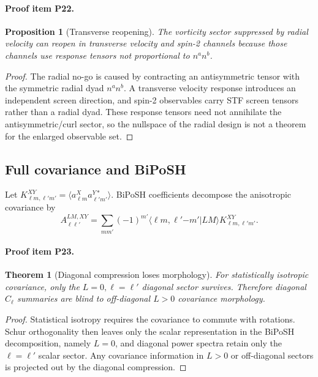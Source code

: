 \documentclass[11pt]{article}
\newtheorem{proposition}{Proposition}
\newtheorem{theorem}{Theorem}
\begin{document}
\paragraph{Proof item P22.}
\begin{proposition}[Transverse reopening]
The vorticity sector suppressed by radial velocity can reopen in transverse velocity and spin-2 channels because those channels use response tensors not proportional to \(n^an^b\).
\end{proposition}
\begin{proof}
The radial no-go is caused by contracting an antisymmetric tensor with the symmetric radial dyad \(n^an^b\).  A transverse velocity response introduces an independent screen direction, and spin-2 observables carry STF screen tensors rather than a radial dyad.  These response tensors need not annihilate the antisymmetric/curl sector, so the nullspace of the radial design is not a theorem for the enlarged observable set.
\end{proof}

\subsection{Full covariance and BiPoSH}
Let \(K^{XY}_{\ell m,\ell' m'}=\langle a^X_{\ell m}a^{Y*}_{\ell'm'}\rangle\).  BiPoSH coefficients decompose the anisotropic covariance by
\[
  A^{LM,XY}_{\ell\ell'}
  =
  \sum_{mm'}(-1)^{m'}
  \langle \ell m,\ell'{-m'}|LM\rangle
  K^{XY}_{\ell m,\ell'm'} .
\]
\paragraph{Proof item P23.}
\begin{theorem}[Diagonal compression loses morphology]
For statistically isotropic covariance, only the \(L=0,\ell=\ell'\) diagonal sector survives.  Therefore diagonal \(C_\ell\) summaries are blind to off-diagonal \(L>0\) covariance morphology.
\end{theorem}
\begin{proof}
Statistical isotropy requires the covariance to commute with rotations.  Schur orthogonality then leaves only the scalar representation in the BiPoSH decomposition, namely \(L=0\), and diagonal power spectra retain only the \(\ell=\ell'\) scalar sector.  Any covariance information in \(L>0\) or off-diagonal sectors is projected out by the diagonal compression.
\end{proof}
\end{document}
